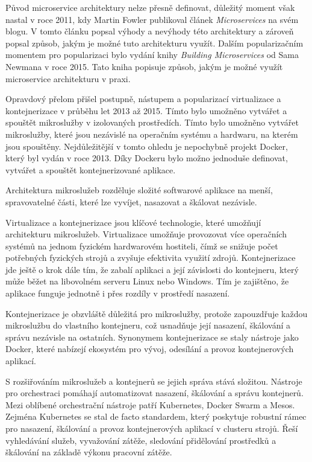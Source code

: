 Původ microservice architektury nelze přesně definovat, důležitý moment však nastal v roce 2011, kdy Martin Fowler publikoval článek \textit{Microservices} na svém blogu. V tomto článku popsal výhody a nevýhody této architektury a zároveň popsal způsob, jakým je možné tuto architekturu využít. \cite{fowler} Dalším popularizačním momentem pro popularizaci bylo vydání knihy \textit{Building Microservices} od Sama Newmana v roce 2015. Tato kniha popisuje způsob, jakým je možné využít microservice architekturu v praxi. \cite{newman}

Opravdový přelom přišel postupně, nástupem a popularizací virtualizace a kontejnerizace v průběhu let 2013 až 2015. Tímto bylo umožněno vytvářet a spouštět mikroslužby v izolovaných prostředích. Tímto bylo umožněno vytvářet mikroslužby, které jsou nezávislé na operačním systému a hardwaru, na kterém jsou spouštěny. Nejdůležitější v tomto ohledu je nepochybně projekt Docker, který byl vydán v roce 2013. Díky Dockeru bylo možno jednoduše definovat, vytvářet a spouštět kontejnerizované aplikace. \cite{docker}


Architektura mikroslužeb rozděluje složité softwarové aplikace na menší, spravovatelné části, které lze vyvíjet, nasazovat a škálovat nezávisle.


Virtualizace a kontejnerizace jsou klíčové technologie, které umožňují architekturu mikroslužeb. Virtualizace umožňuje provozovat více operačních systémů na jednom fyzickém hardwarovém hostiteli, čímž se snižuje počet potřebných fyzických strojů a zvyšuje efektivita využití zdrojů. Kontejnerizace jde ještě o krok dále tím, že zabalí aplikaci a její závislosti do kontejneru, který může běžet na libovolném serveru Linux nebo Windows. Tím je zajištěno, že aplikace funguje jednotně i přes rozdíly v prostředí nasazení.

Kontejnerizace je obzvláště důležitá pro mikroslužby, protože zapouzdřuje každou mikroslužbu do vlastního kontejneru, což usnadňuje její nasazení, škálování a správu nezávisle na ostatních. Synonymem kontejnerizace se staly nástroje jako Docker, které nabízejí ekosystém pro vývoj, odesílání a provoz kontejnerových aplikací.


S rozšiřováním mikroslužeb a kontejnerů se jejich správa stává složitou. Nástroje pro orchestraci pomáhají automatizovat nasazení, škálování a správu kontejnerů. Mezi oblíbené orchestrační nástroje patří Kubernetes, Docker Swarm a Mesos. Zejména Kubernetes se stal de facto standardem, který poskytuje robustní rámec pro nasazení, škálování a provoz kontejnerových aplikací v clusteru strojů. Řeší vyhledávání služeb, vyvažování zátěže, sledování přidělování prostředků a škálování na základě výkonu pracovní zátěže.

